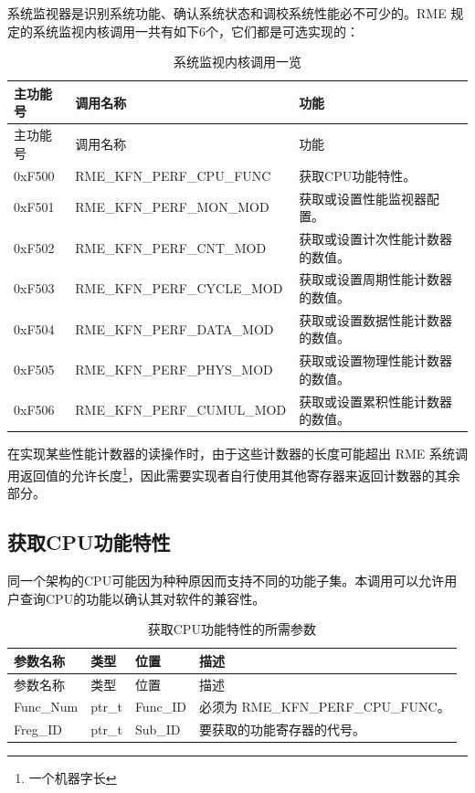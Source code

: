 系统监视器是识别系统功能、确认系统状态和调校系统性能必不可少的。RME 规定的系统监视内核调用一共有如下6个，它们都是可选实现的：

\begin{xltabular}{\textwidth}{@{}>{\hsize\raggedright\arraybackslash}X>{\hsize\raggedright\arraybackslash}X>{\hsize\raggedright\arraybackslash}X@{}}
\caption{系统监视内核调用一览}\label{tab:8-57-system-monitor-kernel-calls}\\
\toprule
主功能号 & 调用名称 & 功能\tabularnewline
\endfirsthead
\toprule
主功能号 & 调用名称 & 功能\tabularnewline
\midrule
\endhead
\bottomrule
\endlastfoot
0xF500 & RME\_KFN\_PERF\_CPU\_FUNC & 获取CPU功能特性。\tabularnewline
0xF501 & RME\_KFN\_PERF\_MON\_MOD &
获取或设置性能监视器配置。\tabularnewline
0xF502 & RME\_KFN\_PERF\_CNT\_MOD &
获取或设置计次性能计数器的数值。\tabularnewline
0xF503 & RME\_KFN\_PERF\_CYCLE\_MOD &
获取或设置周期性能计数器的数值。\tabularnewline
0xF504 & RME\_KFN\_PERF\_DATA\_MOD &
获取或设置数据性能计数器的数值。\tabularnewline
0xF505 & RME\_KFN\_PERF\_PHYS\_MOD &
获取或设置物理性能计数器的数值。\tabularnewline
0xF506 & RME\_KFN\_PERF\_CUMUL\_MOD &
获取或设置累积性能计数器的数值。\tabularnewline
\end{xltabular}

在实现某些性能计数器的读操作时，由于这些计数器的长度可能超出 RME 系统调用返回值的允许长度\footnote{一个机器字长}，因此需要实现者自行使用其他寄存器来返回计数器的其余部分。

\subsection{获取CPU功能特性}\label{subsec:8-get-cpu-features}

同一个架构的CPU可能因为种种原因而支持不同的功能子集。本调用可以允许用户查询CPU的功能以确认其对软件的兼容性。

\begin{xltabular}{\textwidth}{@{}>{\hsize\raggedright\arraybackslash}X>{\hsize\raggedright\arraybackslash}X>{\hsize\raggedright\arraybackslash}X>{\hsize\raggedright\arraybackslash}X@{}}
\caption{获取CPU功能特性的所需参数}\label{tab:8-58-get-cpu-features-parameters}\\
\toprule
参数名称 & 类型 & 位置 & 描述\tabularnewline
\endfirsthead
\toprule
参数名称 & 类型 & 位置 & 描述\tabularnewline
\midrule
\endhead
\bottomrule
\endlastfoot
Func\_Num & ptr\_t & Func\_ID & 必须为 RME\_KFN\_PERF\_CPU\_FUNC。\tabularnewline
Freg\_ID & ptr\_t & Sub\_ID & 要获取的功能寄存器的代号。\tabularnewline
\end{xltabular}

